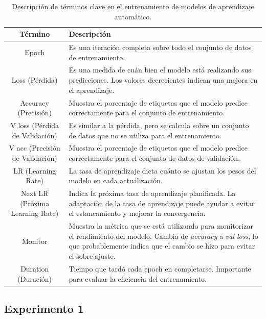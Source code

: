 \begin{table}[ht]
   \centering
   \small
   \begin{tabular}{|c|p{10cm}|}
   \hline
   \textbf{Término} & \textbf{Descripción} \\
   \hline
   Epoch & Es una iteración completa sobre todo el conjunto de datos de entrenamiento. \\
   \hline
   Loss (Pérdida) & Es una medida de cuán bien el modelo está realizando sus predicciones. Los valores decrecientes indican una mejora en el aprendizaje. \\
   \hline
   Accuracy (Precisión) & Muestra el porcentaje de etiquetas que el modelo predice correctamente para el conjunto de entrenamiento. \\
   \hline
   V loss (Pérdida de Validación) & Es similar a la pérdida, pero se calcula sobre un conjunto de datos que no se utiliza para el entrenamiento. \\
   \hline
   V acc (Precisión de Validación) & Muestra el porcentaje de etiquetas que el modelo predice correctamente para el conjunto de datos de validación. \\
   \hline
   LR (Learning Rate) & La tasa de aprendizaje dicta cuánto se ajustan los pesos del modelo en cada actualización. \\
   \hline
   Next LR (Próxima Learning Rate) & Indica la próxima tasa de aprendizaje planificada. La adaptación de la tasa de aprendizaje puede ayudar a evitar el estancamiento y mejorar la convergencia. \\
   \hline
   Monitor & Muestra la métrica que se está utilizando para monitorizar el rendimiento del modelo. Cambia de \textit{accuracy} a \textit{val loss}, lo que probablemente indica que el cambio se hizo para evitar el sobre'ajuste. \\
   \hline
   Duration (Duración) & Tiempo que tardó cada epoch en completarse. Importante para evaluar la eficiencia del entrenamiento. \\
   \hline
   \end{tabular}
   \caption{Descripción de términos clave en el entrenamiento de modelos de aprendizaje automático.}
   \label{table:terminology}
   \end{table}
   

\subsection{Experimento 1}

